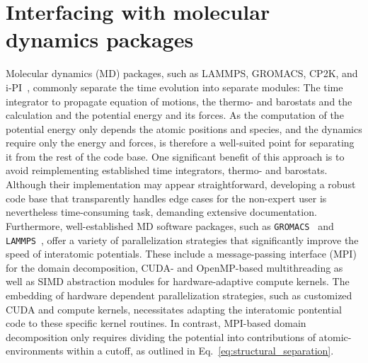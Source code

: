 \section{Interfacing with molecular dynamics packages}
Molecular dynamics (MD) packages, such as LAMMPS, GROMACS, CP2K, and i-PI~\cite{LAMMPS,hess+08jctc,kuhne2020cp2k,kapil2019pi}, commonly separate the time evolution into separate modules: The time integrator to propagate equation of motions, the thermo- and barostats and the calculation and the potential energy and its forces.
As the computation of the potential energy only depends the atomic positions and species, and the dynamics require only the energy and forces, is therefore a well-suited point for separating it from the rest of the code base.
One significant benefit of this approach is to avoid reimplementing established time integrators, thermo- and barostats.
Although their implementation may appear straightforward, developing a robust code base that transparently handles edge cases for the non-expert user is nevertheless time-consuming task, demanding extensive documentation.
Furthermore, well-established MD software packages, such as \texttt{GROMACS}~\cite{abraham2015gromacs} and \texttt{LAMMPS}~\cite{LAMMPS}, offer a variety of parallelization strategies that significantly improve the speed of interatomic potentials.
These include a message-passing interface (MPI) for the domain decomposition, CUDA- and OpenMP-based multithreading as well as SIMD abstraction modules for hardware-adaptive compute kernels.
The embedding of hardware dependent parallelization strategies, such as customized CUDA and compute kernels, necessitates adapting the interatomic pontential code to these specific kernel routines.
In contrast, MPI-based domain decomposition only requires dividing the potential into contributions of atomic-environments within a cutoff, as outlined in Eq.~\eqref{eq:structural_separation}.
